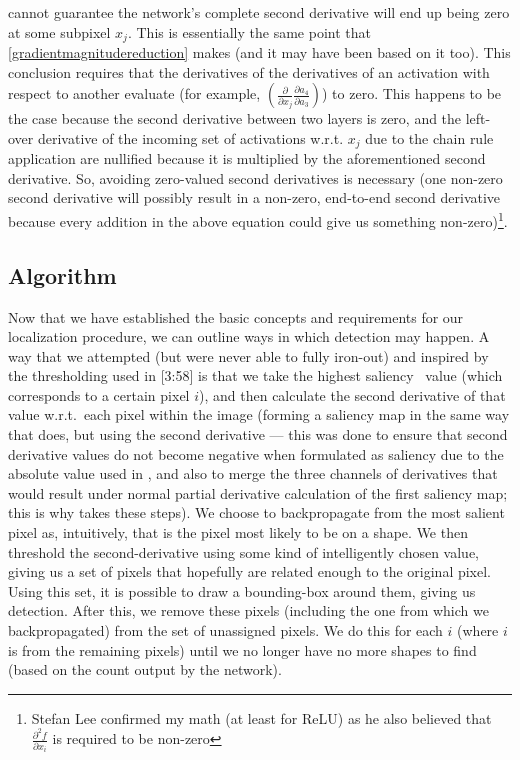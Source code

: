cannot guarantee the network's complete second derivative will end up being zero at some subpixel
$x_j$. This is essentially the same point that \ref{gradientmagnitudereduction} makes (and it may
have been based on it too). This conclusion requires that the derivatives of the derivatives of an
activation with respect to another evaluate (for example, $\left( \frac{\partial}{\partial x_j}
\frac{\partial a_4}{\partial a_3} \right)$) to zero. This happens to be the case because the second
derivative between two layers is zero, and the left-over derivative of the incoming set of
activations w.r.t. $x_j$ due to the chain rule application are nullified because it is multiplied by
the aforementioned second derivative. So, avoiding zero-valued second derivatives is necessary (one
non-zero second derivative will possibly result in a non-zero, end-to-end second derivative because
every addition in the above equation could give us something non-zero)\footnote{Stefan Lee confirmed
my math (at least for ReLU) as he also believed that $\frac{\partial^2 f}{\partial x_i}$ is required
to be non-zero}.

\subsection{Algorithm}
\label{algorithm}

Now that we have established the basic concepts and requirements for our localization procedure, we
can outline ways in which detection may happen. A way that we attempted (but were never able to
fully iron-out) and inspired by the thresholding used in \cite{reeves}[3:58] is that we take the
highest saliency~\cite{simonyan2014deep} value (which corresponds to a certain pixel $i$), and then
calculate the second derivative of that value w.r.t.\ each pixel within the image (forming a
saliency map in the same way that \cite{simonyan2014deep} does, but using the second derivative ---
this was done to ensure that second derivative values do not become negative when formulated as
saliency due to the absolute value used in \cite{simonyan2014deep}, and also to merge the three
channels of derivatives that would result under normal partial derivative calculation of the first
saliency map; this is why \cite{simonyan2014deep} takes these steps). We choose to backpropagate
from the most salient pixel as, intuitively, that is the pixel most likely to be on a shape. We then
threshold the second-derivative using some kind of intelligently chosen value, giving us a set of
pixels that hopefully are related enough to the original pixel. Using this set, it is possible to
draw a bounding-box around them, giving us detection. After this, we remove these pixels (including
the one from which we backpropagated) from the set of unassigned pixels. We do this for each $i$
(where $i$ is from the remaining pixels) until we no longer have no more shapes to find (based on
the count output by the network).

